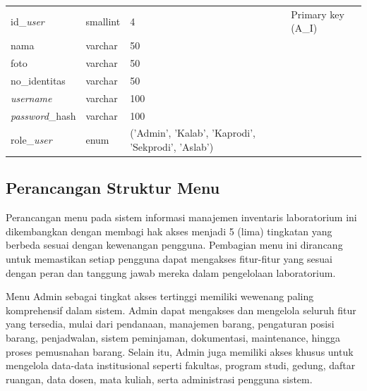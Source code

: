 \begin{enumerate}
{\begin{longtable}{l l l l}
				      id\_\textit{user}       & smallint               & 4                                                  & Primary key (A\_I)    \\
				      nama                    & varchar                & 50                                                 &                       \\
				      foto                    & varchar                & 50                                                 &                       \\
				      no\_identitas           & varchar                & 50                                                 &                       \\
				      \textit{username}       & varchar                & 100                                                &                       \\
				      \textit{password}\_hash & varchar                & 100                                                &                       \\
				      role\_\textit{user}     & enum                   & ('Admin', 'Kalab', 'Kaprodi', 'Sekprodi', 'Aslab') &                       \\
				      \hline
			      \end{longtable}
		      }

\end{enumerate}

\subsection{Perancangan Struktur Menu}
Perancangan menu pada sistem informasi manajemen inventaris laboratorium ini dikembangkan dengan membagi hak akses menjadi 5 (lima) tingkatan yang berbeda sesuai dengan kewenangan pengguna. Pembagian menu ini dirancang untuk memastikan setiap pengguna dapat mengakses fitur-fitur yang sesuai dengan peran dan tanggung jawab mereka dalam pengelolaan laboratorium.

Menu Admin sebagai tingkat akses tertinggi memiliki wewenang paling komprehensif dalam sistem. Admin dapat mengakses dan mengelola seluruh fitur yang tersedia, mulai dari pendanaan, manajemen barang, pengaturan posisi barang, penjadwalan, sistem peminjaman, dokumentasi, maintenance, hingga proses pemusnahan barang. Selain itu, Admin juga memiliki akses khusus untuk mengelola data-data institusional seperti fakultas, program studi, gedung, daftar ruangan, data dosen, mata kuliah, serta administrasi pengguna sistem.

